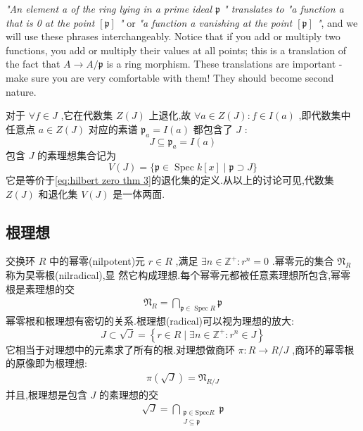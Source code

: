 \textit{"An element a of the ring lying in a prime ideal $\mathfrak{p}$ " translates to "a function a that is 0 at the point $[\mathfrak{p}]$ "} or \textit{"a function a vanishing at the point $[\mathfrak{p}]$ "}, and we will use these phrases interchangeably. Notice that if you add or multiply two functions, you add or multiply their values at all points; this is a translation of the fact that $A \rightarrow A / \mathfrak{p}$ is a ring morphism. These translations are important - make sure you are very comfortable with them! They should become second nature.

对于 $\forall f \in J$ ,它在代数集 $Z(J)$ 上退化,故 $\forall a \in Z(J): f \in I(a)$ ,即代数集中任意点 $a \in Z(J)$ 对应的素谱 $\mathfrak{p}_a=I(a)$ 都包含了 $J$ :
\begin{equation}\label{eq:hilbert zero thm 4}
J \subseteq \mathfrak{p}_a=I(a)
\end{equation}
包含 $J$ 的素理想集合记为
\begin{equation}\label{eq:hilbert zero thm 5}
V(J)=\{\mathfrak{p} \in \operatorname{Spec} k[x] \mid \mathfrak{p} \supset J\}
\end{equation}
它是等价于\eqref{eq:hilbert zero thm 3}的退化集的定义.从以上的讨论可见,代数集 $Z(J)$ 和退化集 $V(J)$ 是一体两面.
\subsection{根理想}
交换环 $R$ 中的幂零(nilpotent)元 $r \in R$ ,满足 $\exists n \in \mathbb{Z}^{+}: r^n=0$ .幂零元的集合 $\mathfrak{N}_R$ 称为旲零根(nilradical),显 然它构成理想.每个幂零元都被任意素理想所包含,幂零根是素理想的交
\begin{align*}
\mathfrak{N}_R=\bigcap_{\mathfrak{p} \in \operatorname{Spec} R} \mathfrak{p}
\end{align*}
幂零根和根理想有密切的关系.根理想(radical)可以视为理想的放大:
\begin{equation}\label{eq:hilbert zero thm 6}
J \subset \sqrt{J}=\left\{r \in R \mid \exists n \in \mathbb{Z}^{+}: r^n \in J\right\}
\end{equation}
它相当于对理想中的元素求了所有的根.对理想做商环 $\pi: R \rightarrow R / J$ ,商环的幂零根的原像即为根理想:
\begin{align*}
\pi(\sqrt{J})=\mathfrak{N}_{R / J}
\end{align*}
并且,根理想是包含 $J$ 的素理想的交
\begin{align*}
\sqrt{J}=\bigcap_{\substack{\mathfrak{p} \in \mathrm{Spec} R \\ J \subseteq \mathfrak{p}}} \mathfrak{p}
\end{align*}

